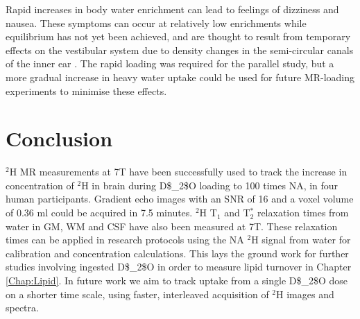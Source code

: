 Rapid increases in body water enrichment can lead to feelings of dizziness and nausea. These symptoms can occur at relatively low enrichments while equilibrium has not yet been achieved, and are thought to result from temporary effects on the vestibular system due to density changes in the semi-circular canals of the inner ear \cite{Money1974HeavyAlcohol}. The rapid loading was required for the parallel study, but a more gradual increase in heavy water uptake could be used for future MR-loading experiments to minimise these effects. 

\section{Conclusion}

$^2$H MR measurements at 7T have been successfully used to track the increase in concentration of $^2$H in brain during \ac{D$_2$O} loading to 100 times \ac{NA}, in four human participants. Gradient echo images with an \ac{SNR} of 16 and a voxel volume of 0.36 ml could be acquired in 7.5 minutes. $^2$H T$_1$ and T$_2^*$ relaxation times from water in \ac{GM}, \ac{WM} and \ac{CSF} have also been measured at 7T. These relaxation times can be applied in research protocols using the \ac{NA} $^2$H signal from water for calibration and concentration calculations. This lays the ground work for further studies involving ingested \ac{D$_2$O} in order to measure lipid turnover in Chapter \ref{Chap:Lipid}. In future work we aim to track uptake from a single \ac{D$_2$O} dose on a shorter time scale, using faster, interleaved acquisition of $^2$H images and spectra. 
